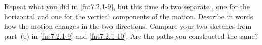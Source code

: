 \label{fnt7.2.1-10}

Repeat what you did in \ref{fnt7.2.1-9}, but this time do two separate \pcharts{}, one for the horizontal and one for the vertical components of the motion. Describe in words how the motion changes in the two directions. Compare your two sketches from part~(e) in \ref{fnt7.2.1-9} and \ref{fnt7.2.1-10}. Are the paths you constructed the same?